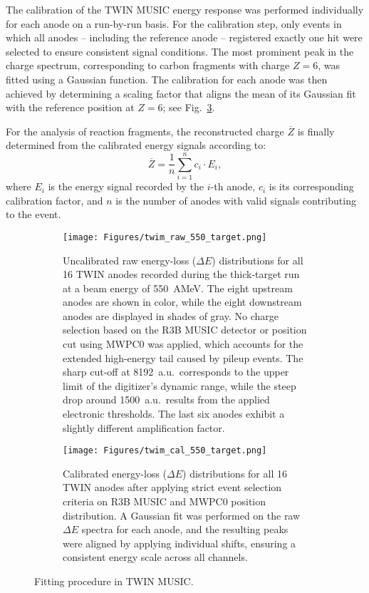 The calibration of the TWIN MUSIC energy response was performed individually for each anode on a run-by-run basis. For the calibration step, only events in which all anodes -- including the reference anode -- registered exactly one hit were selected to ensure consistent signal conditions. The most prominent peak in the charge spectrum, corresponding to carbon fragments with charge \(Z = 6\), was fitted using a Gaussian function. The calibration for each anode was then achieved by determining a scaling factor that aligns the mean of its Gaussian fit with the reference position at \(Z = 6\); see Fig.~\ref{fig:calibration}.

For the analysis of reaction fragments, the reconstructed charge \(\overline{Z}\) is finally determined from the calibrated energy signals according to:
\begin{equation}
\overline{Z} = \frac{1}{n} \sum_{i=1}^{n} c_i \cdot E_i,
\end{equation}
where \(E_i\) is the energy signal recorded by the \(i\)-th anode, \(c_i\) is its corresponding calibration factor, and \(n\) is the number of anodes with valid signals contributing to the event.

\begin{figure}
     \centering
     \begin{subfigure}[t]{0.75\textwidth}
         \centering
         \texttt{[image: Figures/twim\_raw\_550\_target.png]}
         \caption{
	 Uncalibrated raw energy-loss ($\Delta E$) distributions for all 16 TWIN anodes recorded during the thick-target run at a beam energy of 550~AMeV. The eight upstream anodes are shown in color, while the eight downstream anodes are displayed in shades of gray. No charge selection based on the R3B MUSIC detector or position cut using MWPC0 was applied, which accounts for the extended high-energy tail caused by pileup events. The sharp cut-off at 8192~a.u.\ corresponds to the upper limit of the digitizer's dynamic range, while the steep drop around 1500~a.u.\ results from the applied electronic thresholds. The last six anodes exhibit a slightly different amplification factor.
	 }
         \label{fig:raw_twim}
     \end{subfigure}
     \hfill
     \begin{subfigure}[t]{0.75\textwidth}
         \centering
         \texttt{[image: Figures/twim\_cal\_550\_target.png]}
         \caption{Calibrated energy-loss ($\Delta E$) distributions for all 16 TWIN anodes after applying strict event selection criteria on R3B MUSIC and MWPC0 position distribution. A Gaussian fit was performed on the raw $\Delta E$ spectra for each anode, and the resulting peaks were aligned by applying individual shifts, ensuring a consistent energy scale across all channels.}
         \label{fig:cal_twim_one}
     \end{subfigure}
     \hfill
        \caption{Fitting procedure in TWIN MUSIC.}
        \label{fig:calibration}
\end{figure}
